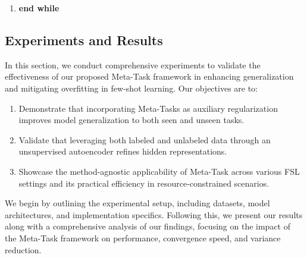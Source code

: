 \begin{algorithm}[t]
\begin{enumerate}
\begin{enumerate}
          \item Use support set $\mathcal{S}$ and embedding network $f_{\theta}$ to obtain meta-learning method $F_{\theta}$
          \item Compute classification loss on query set: \\
          $J_{\mathcal{T}}(\theta) \leftarrow \frac{1}{|\mathcal{Q}|} \sum_{x \in \mathcal{Q}} J_{\mathcal{T}}(x, F_{\theta})$
          \item Update embedding network parameters: \\
          $\theta \leftarrow \theta - \alpha \nabla_{\theta} \left( J_{\mathcal{T}}(\theta) + \lambda J_{\mathcal{M}}(\theta, \phi) \right)$
          \item Update decoder parameters: \\
          $\phi \leftarrow \phi - \lambda \nabla_{\phi} J_{\mathcal{M}}(\theta, \phi)$
      \end{enumerate}
      \item \textbf{end while}
  \end{enumerate}
  \end{algorithm}


\subsection{Experiments and Results}\label{sec:results}

In this section, we conduct comprehensive experiments to validate the effectiveness of our proposed {Meta-Task} framework in enhancing generalization and mitigating overfitting in few-shot learning. Our objectives are to: 
\begin{enumerate} 
\item Demonstrate that incorporating Meta-Tasks as auxiliary regularization improves model generalization to both seen and unseen tasks.
\item Validate that leveraging both labeled and unlabeled data through an unsupervised autoencoder refines hidden representations.
\item Showcase the method-agnostic applicability of {Meta-Task} across various FSL settings and its practical efficiency in resource-constrained scenarios. 
\end{enumerate}
  
We begin by outlining the experimental setup, including datasets, model architectures, and implementation specifics. Following this, we present our results along with a comprehensive analysis of our findings, focusing on the impact of the {Meta-Task} framework on performance, convergence speed, and variance reduction.
  
